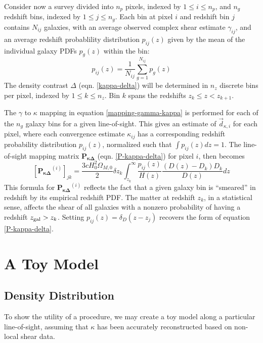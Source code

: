 \documentclass[12pt,preprint]{aastex}			%
\begin{document}
Consider now a survey divided into  $n_p$ pixels, indexed by $1\le i \le n_p$, 
and $n_g$ redshift bins, indexed by $1\le j \le n_g$.  Each bin at pixel $i$ 
and redshift bin $j$ contains $N_{ij}$ galaxies, with an average observed 
complex shear estimate $\gamma_{ij}$, and an average redshift probablility 
distribution $p_{ij}(z)$ given by the mean of the individual galaxy PDFs 
$p_g(z)$ within the bin:
\begin{equation}
  p_{ij}(z) = \frac{1}{N_{ij}}\sum_{g=1}^{N_{ij}}p_g(z)
\end{equation}
The density contrast $\Delta$ (eqn. \ref{kappa-delta}) will be determined in $n_z$ discrete bins per pixel, indexed by $1\le k\le n_z$.  Bin $k$ spans the redshifts $z_k \le z < z_{k+1}$.

The $\gamma$ to $\kappa$ mapping in equation \ref{mapping-gamma-kappa} is 
performed for each of the $n_g$ galaxy bins for a given line-of-sight.  This 
gives an estimate of $\vec{d}_{\kappa,i}$ for each pixel, where each 
convergence estimate $\kappa_{ij}$ has a corresponding redshift probability 
distribution $p_{ij}(z)$, normalized such that $\int p_{ij}(z)dz=1$.  
The line-of-sight mapping matrix $\mathbf{P_{\kappa\Delta}}$ 
(eqn. \ref{P-kappa-delta}) for pixel $i$, then becomes
\begin{equation}
  \label{P-kappa-delta-pdf}
  [\mathbf{P_{\kappa\Delta}}^{(i)}]_{jk} = 
  \frac{3cH_0^2\Omega_{M,0}}{2}\delta z_k
  \int_{z_k}^{\infty} \frac{p_{ij}(z)}{H(z)}\frac{(D(z)-D_k)D_k}{D(z)}dz
\end{equation}
This formula for $\mathbf{P_{\kappa\Delta}}^{(i)}$ reflects the fact that a 
given galaxy bin is ``smeared'' in redshift by its empirical redshift 
PDF.  The matter at redshift $z_k$, in a statistical sense, affects the shear
of all galaxies with a nonzero probability of having a redshift 
$z_{\rm gal} > z_k$.  Setting $p_{ij}(z) = \delta_D(z-z_j)$ recovers the 
form of equation \ref{P-kappa-delta}.

\section{A Toy Model}
\subsection{Density Distribution}
To show the utility of a procedure, we may create a toy model along a particular line-of-sight, assuming that $\kappa$ has been accurately reconstructed based on non-local shear data.  
\end{document}
